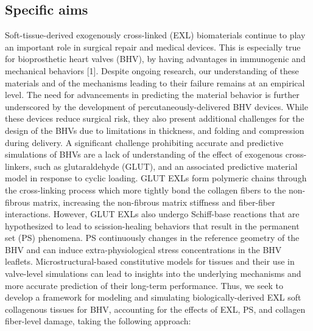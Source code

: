 \subsection{Specific aims}
    Soft-tissue-derived exogenously cross-linked (EXL) biomaterials continue to play an important role in surgical repair and medical devices. This is especially true for bioprosthetic heart valves (BHV), by having advantages in immunogenic and mechanical behaviors [1]. Despite ongoing research, our understanding of these materials and of the mechanisms leading to their failure remains at an empirical level. The need for advancements in predicting the material behavior is further underscored by the development of percutaneously-delivered BHV devices. While these devices reduce surgical risk, they also present additional challenges for the design of the BHVs due to limitations in thickness, and folding and compression during delivery. A significant challenge prohibiting accurate and predictive simulations of BHVs are a lack of understanding of the effect of exogenous cross-linkers, such as glutaraldehyde (GLUT), and an associated predictive material model in response to cyclic loading. GLUT EXLs form polymeric chains through the cross-linking process which more tightly bond the collagen fibers to the non-fibrous matrix, increasing the non-fibrous matrix stiffness and fiber-fiber interactions. However, GLUT EXLs also undergo Schiff-base reactions that are hypothesized to lead to scission-healing behaviors that result in the permanent set (PS) phenomena. PS continuously changes in the reference geometry of the BHV and can induce extra-physiological stress concentrations in the BHV leaflets. Microstructural-based constitutive models for tissues and their use in valve-level simulations can lead to insights into the underlying mechanisms and more accurate prediction of their long-term performance. Thus, we seek to develop a framework for modeling and simulating biologically-derived EXL soft collagenous tissues for BHV, accounting for the effects of EXL, PS, and collagen fiber-level damage, taking the following approach:


